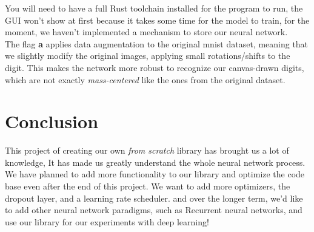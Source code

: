 \documentclass[a4paper, twocolumn, twoside]{article}
\begin{document}
	You will need to have a full Rust toolchain installed for the program to run,
	the GUI won't show at first because it takes some time for the model to train,  for the moment, we haven't implemented a mechanism to store our neural network.\\
	The flag \textbf{a} applies data augmentation to the original mnist dataset, meaning that we slightly modify the original images,
	applying small rotations/shifts to the digit. This makes the network more robust to recognize our canvas-drawn digits,
	which are not exactly \textit{mass-centered} like the ones from the original dataset.
	\section{Conclusion}
	This project of creating our own \textit{from scratch} library has brought us a lot of knowledge,
	It has made us greatly understand the whole neural network process.
	We have planned to add more functionality to our library and optimize the code base even after the end of this project.
	We want to add more optimizers, the dropout layer, and a learning rate scheduler.
	and over the longer term, we'd like to add other neural network paradigms, such as Recurrent neural networks, and use our library for our experiments with deep learning!
	\nocite{*}
	\printbibliography
\end{document}
